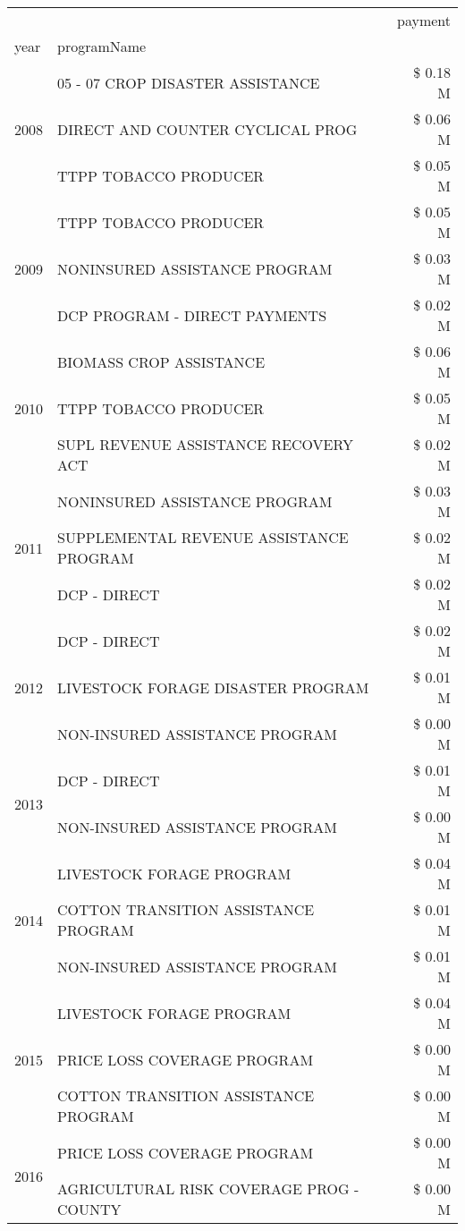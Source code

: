 \begin{tabular}{llr}
\toprule
 &  & payment \\
year & programName &  \\
\midrule
\multirow[t]{3}{*}{2008} & 05 - 07 CROP DISASTER ASSISTANCE & \$ 0.18 M \\
 & DIRECT AND COUNTER CYCLICAL PROG & \$ 0.06 M \\
 & TTPP TOBACCO PRODUCER & \$ 0.05 M \\
\cline{1-3}
\multirow[t]{3}{*}{2009} & TTPP TOBACCO PRODUCER & \$ 0.05 M \\
 & NONINSURED ASSISTANCE PROGRAM & \$ 0.03 M \\
 & DCP PROGRAM - DIRECT PAYMENTS & \$ 0.02 M \\
\cline{1-3}
\multirow[t]{3}{*}{2010} & BIOMASS CROP ASSISTANCE & \$ 0.06 M \\
 & TTPP TOBACCO PRODUCER & \$ 0.05 M \\
 & SUPL REVENUE ASSISTANCE RECOVERY ACT & \$ 0.02 M \\
\cline{1-3}
\multirow[t]{3}{*}{2011} & NONINSURED ASSISTANCE PROGRAM & \$ 0.03 M \\
 & SUPPLEMENTAL REVENUE ASSISTANCE PROGRAM & \$ 0.02 M \\
 & DCP - DIRECT & \$ 0.02 M \\
\cline{1-3}
\multirow[t]{3}{*}{2012} & DCP - DIRECT & \$ 0.02 M \\
 & LIVESTOCK FORAGE DISASTER PROGRAM & \$ 0.01 M \\
 & NON-INSURED ASSISTANCE PROGRAM & \$ 0.00 M \\
\cline{1-3}
\multirow[t]{2}{*}{2013} & DCP - DIRECT & \$ 0.01 M \\
 & NON-INSURED ASSISTANCE PROGRAM & \$ 0.00 M \\
\cline{1-3}
\multirow[t]{3}{*}{2014} & LIVESTOCK FORAGE PROGRAM & \$ 0.04 M \\
 & COTTON TRANSITION ASSISTANCE PROGRAM & \$ 0.01 M \\
 & NON-INSURED ASSISTANCE PROGRAM & \$ 0.01 M \\
\cline{1-3}
\multirow[t]{3}{*}{2015} & LIVESTOCK FORAGE PROGRAM & \$ 0.04 M \\
 & PRICE LOSS COVERAGE PROGRAM & \$ 0.00 M \\
 & COTTON TRANSITION ASSISTANCE PROGRAM & \$ 0.00 M \\
\cline{1-3}
\multirow[t]{2}{*}{2016} & PRICE LOSS COVERAGE PROGRAM                   & \$ 0.00 M \\
 & AGRICULTURAL RISK COVERAGE PROG - COUNTY      & \$ 0.00 M \\

\end{tabular}
